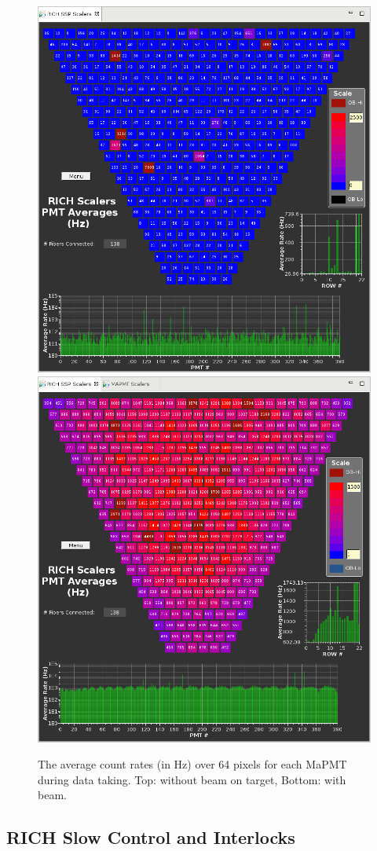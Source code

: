 \documentclass[5p,times,twocolumn]{elsarticle}
\begin{document}
\begin{figure}[t]
\begin{center}
\includegraphics[width=0.7\columnwidth]{Scalers_BeamOff.png}
\includegraphics[width=0.7\columnwidth]{Scalers_BeamOn.png}
\end{center}
\caption{The average count rates (in Hz) over 64 pixels for each MaPMT during data taking. Top: without beam on
  target, Bottom: with beam.}
\label{fig:Online_Scalers}
\end{figure}

\subsection{RICH Slow Control and Interlocks}
\label{sec:SlowControl}
\end{document}
